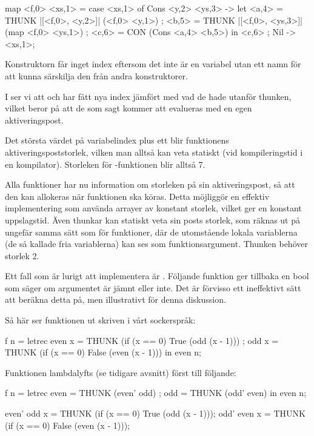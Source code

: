 \documentclass[../Core]{subfiles}
\begin{document}
\begin{codeExDiff}
map <f,0> <xs,1> = case <xs,1> of
    { Cons <y,2> <ys,3> -> let
        { <a,4> = THUNK |[<f,0>, <y,2>]|  (<f,0> <y,1>)
        ; <b,5> = THUNK |[<f,0>, <ys,3>]| (map <f,0> <ys,1>)
        ; <c,6> = CON (Cons <a,4> <b,5>)
        } in <c,6>
    ; Nil -> <xs,1>};
\end{codeExDiff}

Konstruktorn  får inget index eftersom det inte är en variabel
utan ett namn för att kunna särskilja den från andra konstruktorer. 

I  ser vi att 
 och  har fått nya index jämfört med vad de
hade utanför thunken, vilket beror på att de som sagt kommer att evalueras
med en egen aktiveringspost.

Det största värdet på variabelindex plus ett blir funktionens
aktiveringspoststorlek, vilken man alltså kan veta statiskt
(vid kompileringstid i en kompilator). Storleken för -funktionen blir alltså 7.

Alla funktioner har nu information om storleken på sin aktiveringspost, så att 
den kan allokeras när funktionen ska köras.
Detta möjliggör en effektiv implementering som använda arrayer av konstant 
storlek, vilket ger en konstant uppslagstid.
Även thunkar kan statiskt veta sin posts storlek,
som räknas ut på ungefär samma sätt som
för funktioner, där de utomstående lokala variablerna (de så kallade fria 
variablerna) kan ses som funktionsargument.
Thunken  behöver storlek 2.

Ett fall som är lurigt att implementera är .
Följande funktion  ger tillbaka en bool som säger om 
argumentet  är jämnt eller inte. Det är förvisso ett
ineffektivt sätt att beräkna detta på, men illustrativt för denna diskussion.

Så här ser funktionen ut skriven i vårt sockerspråk:

\begin{codeEx}
f n = letrec 
    { even x = THUNK (if (x == 0) True  (odd  (x - 1)))
    ; odd  x = THUNK (if (x == 0) False (even (x - 1)))
    } in even n;
\end{codeEx}

Funktionen lambdalyfts (se tidigare avsnitt) först till följande:

\begin{codeEx}
f n = letrec 
    { even = THUNK (even' odd)
    ; odd  = THUNK (odd' even)
    } in even n;
    
even' odd x = THUNK (if (x == 0) True  (odd  (x - 1)));
odd' even x = THUNK (if (x == 0) False (even (x - 1)));
\end{codeEx}
\end{document}
